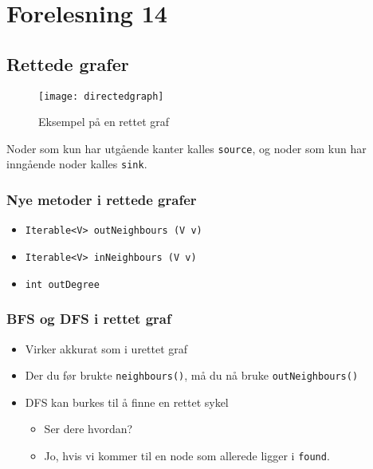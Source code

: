 \documentclass{article}
\begin{document}
    \section{Forelesning 14}
    \subsection{Rettede grafer}

    \begin{figure}[H]
        \begin{center}
            \texttt{[image: directedgraph]}
        \end{center}
        \caption{Eksempel på en rettet graf}
        \label{fig:directedgraph}
    \end{figure}

    Noder som kun har utgående kanter kalles \texttt{source}, og noder som kun har inngående noder kalles \texttt{sink}.

    \subsubsection{Nye metoder i rettede grafer}

    \begin{itemize}
        \item \texttt{Iterable<V> outNeighbours (V v)}
        \item \texttt{Iterable<V> inNeighbours (V v)}
        \item \texttt{int outDegree}
    \end{itemize}

    \subsubsection{BFS og DFS i rettet graf}
    \begin{itemize}
        \item Virker akkurat som i urettet graf
        \item Der du før brukte \texttt{neighbours()}, må du nå bruke \texttt{outNeighbours()}
        \item DFS kan burkes til å finne en rettet sykel
            \begin{itemize}
                \item Ser dere hvordan?
                \item Jo, hvis vi kommer til en node som allerede ligger i \texttt{found}.
            \end{itemize}
    \end{itemize}
\end{document}

